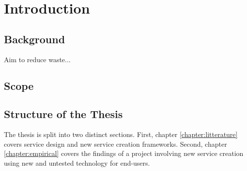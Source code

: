 
 
\chapter{Introduction}
\label{chapter:intro}

\section{Background}
\label{section:background}

Aim to reduce waste...

\section{Scope}
\label{section:scope}


\section{Structure of the Thesis}
\label{section:structure}

The thesis is split into two distinct sections. First, chapter \ref{chapter:litterature} covers service design and new service creation frameworks. Second, chapter \ref{chapter:empirical} covers the findings of a project involving new service creation using new and untested technology for end-users.


